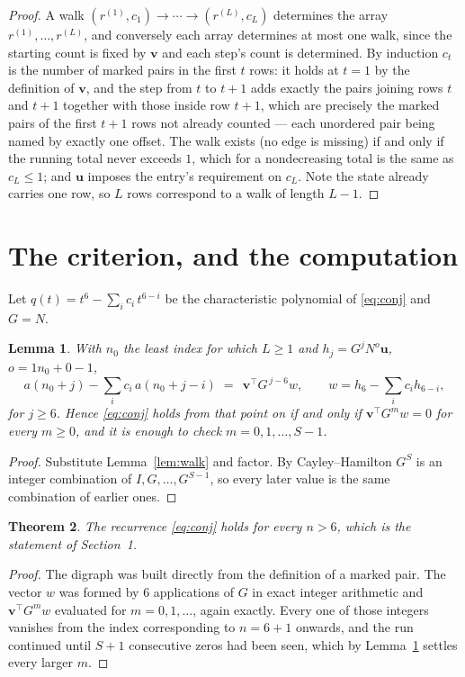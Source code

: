 \documentclass[11pt,a4paper]{article}
\theoremstyle{plain}
\newtheorem{theorem}{Theorem}
\newtheorem{lemma}[theorem]{Lemma}
\theoremstyle{definition}
\begin{document}
\begin{proof}
A walk $(r^{(1)},c_1)\to\cdots\to(r^{(L)},c_L)$ determines the array
$r^{(1)},\dots,r^{(L)}$, and conversely each array determines at most one walk, since the
starting count is fixed by $\mathbf{v}$ and each step's count is determined. By induction
$c_t$ is the number of marked pairs in the first $t$ rows: it holds at $t=1$ by the
definition of $\mathbf{v}$, and the step from $t$ to $t+1$ adds exactly the pairs joining
rows $t$ and $t+1$ together with those inside row $t+1$, which are precisely the marked
pairs of the first $t+1$ rows not already counted --- each unordered pair being named by
exactly one offset. The walk exists (no edge is missing) if and only if the running total
never exceeds $1$, which for a nondecreasing total is the same as $c_L\le1$; and
$\mathbf{u}$ imposes the entry's requirement on $c_L$. Note the state already carries one
row, so $L$ rows correspond to a walk of length $L-1$.
\end{proof}

\section{The criterion, and the computation}

Let $q(t)=t^{6}-\sum_i c_i\,t^{6-i}$ be the characteristic polynomial of
\eqref{eq:conj} and $G=N$.

\begin{lemma}\label{lem:crit}
With $n_0$ the least index for which $L\ge1$ and $h_j=G^{j}N^{o}\mathbf{u}$,
$o=1n_0+0-1$,
\[
a(n_0+j)-\sum_i c_i\,a(n_0+j-i)\;=\;\,\mathbf{v}^{\!\top}G^{\,j-6}w,
\qquad w=h_{6}-\sum_i c_i h_{6-i},
\]
for $j\ge6$. Hence \eqref{eq:conj} holds from that point on if and only if
$\mathbf{v}^{\!\top}G^{m}w=0$ for every $m\ge0$, and it is enough to check
$m=0,1,\dots,S-1$.
\end{lemma}

\begin{proof}
Substitute Lemma~\ref{lem:walk} and factor. By Cayley--Hamilton $G^{S}$ is an integer
combination of $I,G,\dots,G^{S-1}$, so every later value is the same combination of earlier
ones.
\end{proof}

\begin{theorem}
The recurrence \eqref{eq:conj} holds for every $n>6$, which is the statement of
Section~1.
\end{theorem}

\begin{proof}
The digraph was built directly from the definition of a marked pair. The vector $w$ was
formed by $6$ applications of $G$ in exact integer arithmetic and
$\mathbf{v}^{\!\top}G^{m}w$ evaluated for $m=0,1,\dots$, again exactly. Every one of
those integers vanishes from the index corresponding to $n=6+1$ onwards, and the run
continued until $S+1$ consecutive zeros had been seen, which by Lemma~\ref{lem:crit}
settles every larger $m$.
\end{proof}
\end{document}
